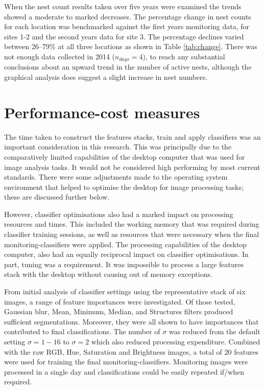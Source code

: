 When the nest count results taken over five years were examined the trends showed a moderate to marked decreases. The percentage change in nest counts for each location was benchmarked against the first years monitoring data, for sites 1-2 and the second years data for site 3. The percentage declines varied between 26--79\% at all three locations as shown in Table \ref{tab:change}. There was not enough data collected in 2014 ($ n_{days} = 4 $), to reach any substantial conclusions about an upward trend in the number of active nests, although the graphical analysis does suggest a slight increase in nest numbers. 

\section{Performance-cost measures} 
The time taken to construct the features stacks, train and apply classifiers was an important consideration in this research. This was principally due to the comparatively limited capabilities of the desktop computer that was used for image analysis tasks. It would not be considered high performing by most current standards. There were some adjustments made to the operating system environment that helped to optimise the desktop for image processing tasks; these are discussed further below. 

However, classifier optimisations also had a marked impact on processing resources and times. This included the working memory that was required during classifier training sessions, as well as resources that were necessary when the final monitoring-classifiers were applied. The processing capabilities of the desktop computer, also had an equally reciprocal impact on classifier optimisations. In part, tuning was a requirement. It was impossible to process a large features stack with the desktop without causing out of memory exceptions.

From initial analysis of classifier settings using the representative stack of six images, a range of feature importances were investigated. Of those tested, Gaussian blur, Mean, Minimum, Median, and Structures filters produced sufficient segmentations. Moreover, they were all shown to have importances that contributed to final classifications. The number of $\sigma$ was reduced from the default setting $\sigma = 1-16$ to $\sigma = 2$ which also reduced processing expenditure. Combined with the raw RGB, Hue, Saturation and Brightness images, a total of 20 features were used for training the final monitoring-classifiers. Monitoring images were processed in a single day and classifications could be easily repeated if/when required.

